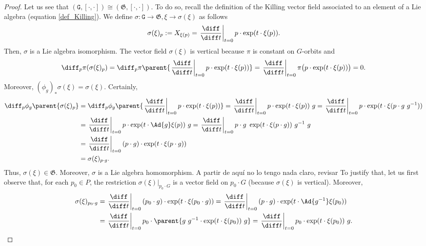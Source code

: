 \begin{proof}
    Let us see that \((\mathtt{G}, [\cdot, \cdot])\cong (\mathfrak{G}, [\cdot, \cdot])\). To do so, recall the definition of the Killing vector field associated to an element of a Lie algebra (equation \ref{def_Killing}). We define \(\sigma\colon \mathtt{G} \to \mathfrak{G}, \xi \to \sigma(\xi)\) as follows
    \[
    \sigma(\xi)_p:=X_{\xi(p)}=\left.\frac{\diff}{\diff t} \right|_{t=0} p \cdot \exp(t \cdot \xi(p)). 
    \]
    Then, {\color{red} \(\sigma\) is a Lie algebra isomorphism}. The vector field \(\sigma(\xi)\) is vertical because \(\pi\) is constant on \(G\)-orbits and
    \[
    \diff_p\pi (\sigma(\xi)_p)=\diff_p\pi \parent{\left.\frac{\diff}{\diff t} \right|_{t=0} p \cdot \exp(t \cdot \xi(p))} =\left.\frac{\diff}{\diff t}  \right|_{t=0} \pi \big(p \cdot \exp(t \cdot \xi(p)) \big) = 0.
    \]
    Moreover, \((\phi_g)_*\sigma(\xi)=\sigma(\xi)\). Certainly,
    \begin{align*}
        \diff_p\phi_g\parent{\sigma(\xi)_p} & = \diff_p \phi_g \parent{\left.\frac{\diff}{\diff t} \right|_{t=0} p \cdot \exp(t \cdot \xi(p))} = \left.\frac{\diff}{\diff t} \right|_{t=0} p \cdot \exp(t \cdot \xi(p)) \ g
        =\left.\frac{\diff}{\diff t} \right|_{t=0} p \cdot \exp(t \cdot \xi(p\cdot g\ g^{-1})) \\
        & = \left.\frac{\diff}{\diff t} \right|_{t=0} p \cdot \exp(t \cdot \Ad{g}\xi(p)) \ g = \left.\frac{\diff}{\diff t} \right|_{t=0} p \cdot g \ \exp(t \cdot \xi(p\cdot g)) \ g^{-1} \ g \\
        & = \left.\frac{\diff}{\diff t} \right|_{t=0} (p\cdot g) \cdot \exp(t \cdot \xi(p\cdot g)) \\
        & = \sigma(\xi)_{p \cdot g}.
    \end{align*}
    Thus, \(\sigma(\xi) \in \mathfrak{G}\). Moreover, \(\sigma\) is a Lie algebra homomorphism. {\color{red} A partir de aquí no lo tengo nada claro, revisar} To justify that, let us first observe that, for each \(p_0 \in P\), the restriction \(\sigma(\xi)|_{p_0 \cdot G}\) is a vector field on \(p_0 \cdot G\) (because \(\sigma(\xi)\) is vertical). Moreover,
    \begin{align*}
        \sigma(\xi)_{p_0 \cdot g} & = \left.\frac{\diff}{\diff t} \right|_{t=0} (p_0\cdot g) \cdot \exp(t \cdot \xi(p_0 \cdot g)) = \left.\frac{\diff}{\diff t} \right|_{t=0} (p\cdot g) \cdot \exp(t \cdot \Ad{g^{-1}}\xi(p_0)) \\
        & =\left.\frac{\diff}{\diff t} \right|_{t=0} p_0\cdot \parent{g \ g^{-1} \cdot \exp(t \cdot \xi(p_0))\ g}= \left.\frac{\diff}{\diff t} \right|_{t=0} p_0 \cdot \exp(t \cdot \xi(p_0))\ g.

\end{align*}
\end{proof}

